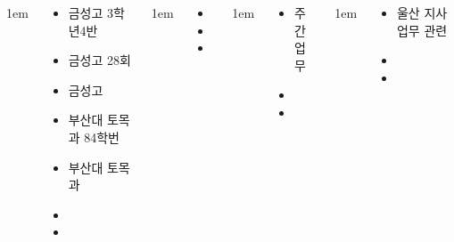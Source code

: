 \documentclass[	20pt, 
							a0paper, 
							landscape,
							margin=0mm, %
							innermargin=10mm,  		%
							blockverticalspace=4mm, %
							colspace=5mm, 
							subcolspace=0mm
							]{tikzposter}
\begin{document}
\begin{columns}
			{
					\setlength{\leftmargini}{4em}
					\setlength{\labelsep} {1em}
				\begin{LARGE}
					\begin{itemize}
					\item 금성고 3학년4반
					\item 금성고 28회
					\item 금성고
					\item 부산대 토목과 84학번
					\item 부산대 토목과
					\item 
					\item 
					\end{itemize}
				\end{LARGE}
			} %

			{
					\setlength{\leftmargini}{4em}
					\setlength{\labelsep} {1em}
				\begin{LARGE}
					\begin{itemize}
					\item 
					\item 
					\item 
					\end{itemize}
				\end{LARGE}
			} %





			{
					\setlength{\leftmargini}{4em}
					\setlength{\labelsep} {1em}
				\begin{LARGE}
					\begin{itemize}
					\item 주간업무
					\item 
					\item 
					\end{itemize}
				\end{LARGE}
			} %


			{
					\setlength{\leftmargini}{4em}
					\setlength{\labelsep} {1em}
				\begin{LARGE}
					\begin{itemize}
					\item 울산 지사 업무 관련
					\item 
					\item 
					\end{itemize}
				\end{LARGE}
			} %




\end{columns}
\end{document}
